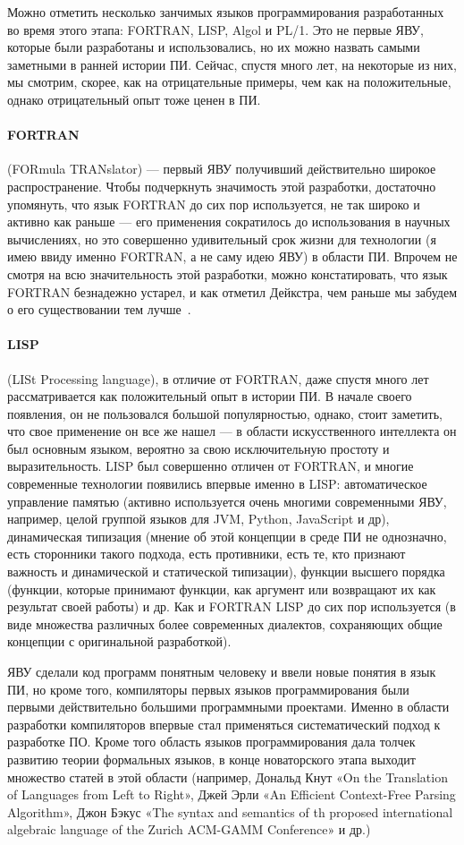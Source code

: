 Можно отметить несколько занчимых языков программирования разработанных во время этого этапа: FORTRAN, LISP, Algol и PL/1. Это не первые ЯВУ, которые были разработаны и использовались, но их можно назвать самыми заметными в ранней истории ПИ. Сейчас, спустя много лет, на некоторые из них, мы смотрим, скорее, как на отрицательные примеры, чем как на положительные, однако отрицательный опыт тоже ценен в ПИ.

\paragraph{FORTRAN} (FORmula TRANslator) — первый ЯВУ получивший действительно широкое распространение. Чтобы подчеркнуть значимость этой разработки, достаточно упомянуть, что язык FORTRAN до сих пор используется, не так широко и активно как раньше — его применения сократилось до использования в научных вычислениях, но это совершенно удивительный срок жизни для технологии (я имею ввиду именно FORTRAN, а не саму идею ЯВУ) в области ПИ. Впрочем не смотря на всю значительность этой разработки, можно констатировать, что язык FORTRAN безнадежно устарел, и как отметил Дейкстра, чем раньше мы забудем о его существовании тем лучше~\cite{Dijkstra:1972:HP}.

\paragraph{LISP} (LISt Processing language), в отличие от FORTRAN, даже спустя много лет рассматривается как положительный опыт в истории ПИ. В начале своего появления, он не пользовался большой популярностью, однако, стоит заметить, что свое применение он все же нашел — в области искусственного интеллекта он был основным языком, вероятно за свою исключительную простоту и выразительность. LISP был совершенно отличен от FORTRAN, и многие современные технологии появились впервые именно в LISP: автоматическое управление памятью (активно используется очень многими современными ЯВУ, например, целой группой языков для JVM, Python, JavaScript и др), динамическая типизация (мнение об этой концепции в среде ПИ не однозначно, есть сторонники такого подхода, есть противники, есть те, кто признают важность и динамической и статической типизации), функции высшего порядка (функции, которые принимают функции, как аргумент или возвращают их как результат своей работы) и др. Как и FORTRAN LISP до сих пор используется (в виде множества различных более современных диалектов, сохраняющих общие концепции с оригинальной разработкой).

ЯВУ сделали код программ понятным человеку и ввели новые понятия в язык ПИ, но кроме того, компиляторы первых языков программирования были первыми действительно большими программными проектами. Именно в области разработки компиляторов впервые стал применяться систематический подход к разработке ПО. Кроме того область языков программирования дала толчек развитию теории формальных языков, в конце новаторского этапа выходит множество статей в этой области (например, Дональд Кнут «On the Translation of Languages from Left to Right», Джей Эрли «An Efficient Context-Free Parsing Algorithm», Джон Бэкус «The syntax and semantics of th proposed international algebraic language of the Zurich ACM-GAMM Conference» и др.)
